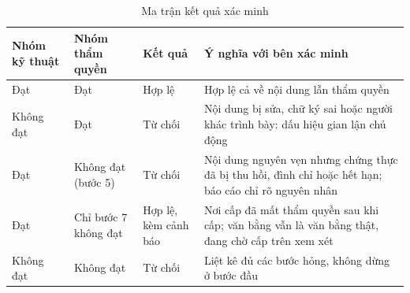 \begin{table}[H]
\centering
\caption{Ma trận kết quả xác minh}
\label{tab:v2-verif-matrix}
\renewcommand{\arraystretch}{1.2}
\small
\begin{tabular}{|p{2.2cm}|p{2.4cm}|p{1.6cm}|p{7.0cm}|}
\hline
\textbf{Nhóm kỹ thuật} & \textbf{Nhóm thẩm quyền} & \textbf{Kết quả} & \textbf{Ý nghĩa với bên xác minh} \\ \hline
Đạt & Đạt & Hợp lệ & Hợp lệ cả về nội dung lẫn thẩm quyền \\ \hline
Không đạt & Đạt & Từ chối & Nội dung bị sửa, chữ ký sai hoặc người khác trình bày: dấu hiệu gian lận chủ động \\ \hline
Đạt & Không đạt (bước 5) & Từ chối & Nội dung nguyên vẹn nhưng chứng thực đã bị thu hồi, đình chỉ hoặc hết hạn; báo cáo chỉ rõ nguyên nhân \\ \hline
Đạt & Chỉ bước 7 không đạt & Hợp lệ, kèm cảnh báo & Nơi cấp đã mất thẩm quyền sau khi cấp; văn bằng vẫn là văn bằng thật, đang chờ cấp trên xem xét \\ \hline
Không đạt & Không đạt & Từ chối & Liệt kê đủ các bước hỏng, không dừng ở bước đầu \\ \hline
\end{tabular}
\end{table}
